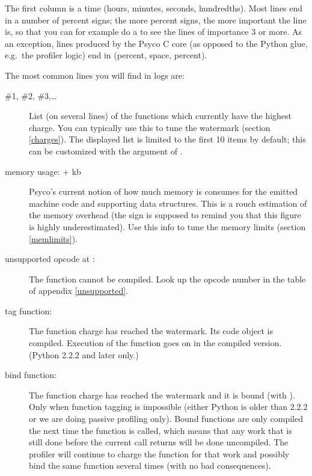 \documentclass{manual}
\begin{document}
The first column is a time (hours, minutes, seconds, hundredths).  Most lines end in a number of percent signs; the more percent signs, the more important the line is, so that you can for example do a  to see the lines of importance 3 or more.  As an exception, lines produced by the Psyco C core (as opposed to the Python glue, e.g.\ the profiler logic) end in \samp{\%\ \%} (percent, space, percent).

The most common lines you will find in logs are:
%
\begin{description}

\item[\#1, \#2, \#3,\ldots]
  List (on several lines) of the functions which currently have the highest charge.  You can typically use this to tune the watermark (section \ref{charges}).  The displayed list is limited to the first 10 items by default; this can be customized with the  argument of .

\item[memory usage: + kb]
  Psyco's current notion of how much memory is consumes for the emitted machine code and supporting data structures.  This is a rouch estimation of the memory overhead (the \code{+} sign is supposed to remind you that this figure is highly underestimated).  Use this info to tune the memory limits (section \ref{memlimits}).

\item[unsupported opcode  at :]
  The function  cannot be compiled.  Look up the opcode number  in the table of appendix \ref{unsupported}.

\item[tag function: ]
  The function charge has reached the watermark.  Its code object is compiled.  Execution of the function goes on in the compiled version.  (Python 2.2.2 and later only.)

\item[bind function: ]
  The function charge has reached the watermark and it is bound (with ).  Only when function tagging is impossible (either Python is older than 2.2.2 or we are doing passive profiling only).  Bound functions are only compiled the next time the function is called, which means that any work that is still done before the current call returns will be done uncompiled.  The profiler will continue to charge the function for that work and possibly bind the same function several times (with no bad consequences).


\end{description}
\end{document}
